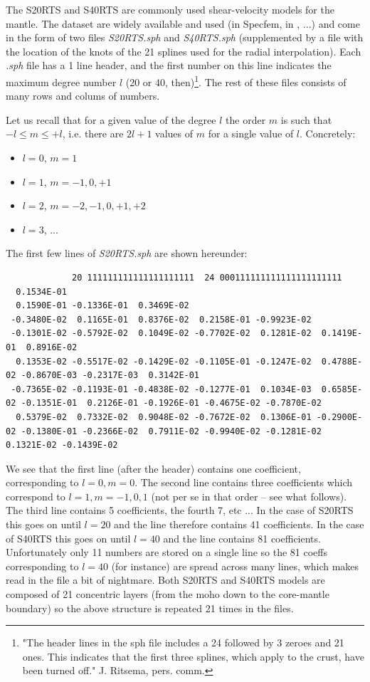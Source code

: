 

The S20RTS \cite{rivw99} and S40RTS \cite{ridv11} are commonly used shear-velocity models for the mantle.
The dataset are widely available and used (in Specfem, in \aspect, ...) and come in the form of two 
files {\sl S20RTS.sph} and {\sl S40RTS.sph} (supplemented by a file with the location of the 
knots of the 21 splines used for the radial interpolation). 
Each {\sl .sph} file has a 1 line header, and the first number on this line indicates 
the maximum degree number $l$ (20 or 40, then)\footnote{
"The header lines in the sph file includes a 24 followed by 3 zeroes and 21 ones. 
This indicates that the first three splines, which apply to the crust, have been turned off."
J. Ritsema, pers. comm.}. The rest of these files consists of many rows and colums of numbers.

Let us recall that for a given value of the degree $l$ the order $m$ is such that $-l \le m \le +l$, i.e. 
there are $2l+1$ values of $m$ for a single value of $l$. Concretely:
\begin{itemize}
\item $l=0$, $m=1$ 
\item $l=1$, $m=-1,0,+1$ 
\item $l=2$, $m=-2,-1,0,+1,+2$ 
\item $l=3$, ...
\end{itemize}
The first few lines of {\sl S20RTS.sph} are shown hereunder:
\begin{tiny}
\begin{verbatim}
             20 111111111111111111111  24 000111111111111111111111 
  0.1534E-01
  0.1590E-01 -0.1336E-01  0.3469E-02
 -0.3480E-02  0.1165E-01  0.8376E-02  0.2158E-01 -0.9923E-02
 -0.1301E-02 -0.5792E-02  0.1049E-02 -0.7702E-02  0.1281E-02  0.1419E-01  0.8916E-02
  0.1353E-02 -0.5517E-02 -0.1429E-02 -0.1105E-01 -0.1247E-02  0.4788E-02 -0.8670E-03 -0.2317E-03  0.3142E-01
 -0.7365E-02 -0.1193E-01 -0.4838E-02 -0.1277E-01  0.1034E-03  0.6585E-02 -0.1351E-01  0.2126E-01 -0.1926E-01 -0.4675E-02 -0.7870E-02
  0.5379E-02  0.7332E-02  0.9048E-02 -0.7672E-02  0.1306E-01 -0.2900E-02 -0.1380E-01 -0.2366E-02  0.7911E-02 -0.9940E-02 -0.1281E-02  0.1321E-02 -0.1439E-02
\end{verbatim}
\end{tiny}

We see that the first line (after the header) contains one coefficient, corresponding to ${l=0},{m=0}$. 
The second line contains three coefficients which correspond to ${l=1},{m=-1,0,1}$ (not 
per se in that order -- see what follows). The third line contains 5 
coefficients, the fourth 7, etc ... 
In the case of S20RTS this goes on until $l=20$ and the line therefore contains 41 coefficients.
In the case of S40RTS this goes on until $l=40$ and the line contains 81 coefficients.
Unfortunately only 11 numbers are stored on a single line so the 81 coeffs corresponding 
to $l=40$ (for instance)
are spread across many lines, which makes read in the file a bit of nightmare. 
Both S20RTS and S40RTS models are composed of 21 concentric layers (from the moho down 
to the core-mantle boundary) 
so the above structure is repeated 21 times in the files. 

